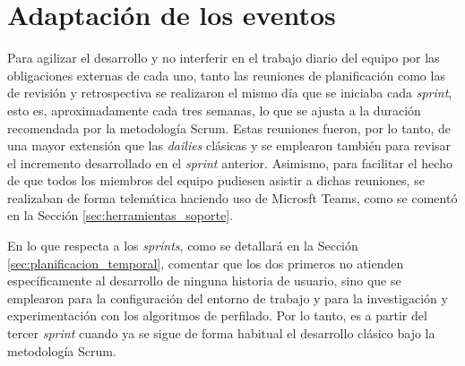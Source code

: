 \section{{\color{blue}Adaptación de los eventos}}
\label{sec:metodologia_eventos}

Para agilizar el desarrollo y no interferir en el trabajo diario del equipo por las obligaciones
externas de cada uno, tanto las reuniones de planificación como las de revisión y retrospectiva se realizaron
el mismo día que se iniciaba cada \textit{sprint}, esto es, aproximadamente cada tres semanas, lo que se ajusta a la duración recomendada
por la metodología Scrum. Estas reuniones fueron, por lo tanto, de una mayor extensión que las \textit{dailies} clásicas y se emplearon también
para revisar el incremento desarrollado en el \textit{sprint} anterior. Asimismo, para facilitar el hecho de que todos los miembros
del equipo pudiesen asistir a dichas reuniones, se realizaban de forma telemática haciendo uso de Microsft Teams, como se comentó en la Sección \ref{sec:herramientas_soporte}.

\bigskip
En lo que respecta a los \textit{sprints}, como se detallará en la Sección \ref{sec:planificacion_temporal}, comentar que los dos primeros
no atienden específicamente al desarrollo de ninguna historia de usuario, sino que se emplearon para la configuración del entorno de trabajo
y para la investigación y experimentación con los algoritmos de perfilado. Por lo tanto, es a partir del tercer \textit{sprint} cuando
ya se sigue de forma habitual el desarrollo clásico bajo la metodología Scrum.
